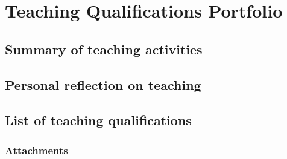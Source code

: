\chapter{Teaching Qualifications Portfolio}

\section{Summary of teaching activities}

\section{Personal reflection on teaching}

\section{List of teaching qualifications}

\subsection{Attachments}
